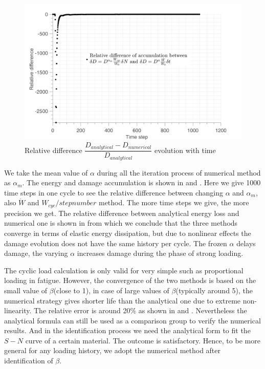 \begin{figure}[!h]
\centering
\includegraphics[width=\textwidth]{figures//D_3methods_diff_100steps.png} 
\caption{Relative difference $\dfrac{D_{analytical}-D_{numerical}}{D_{analytical}}$ evolution with time}
\label{Damagediff}
\end{figure}
We take the mean value of $\alpha$ during all the iteration process of numerical method as $\alpha_{m}$. The energy and damage accumulation is shown in  and . Here we give 1000 time steps in one cycle to see the relative difference between changing $\alpha$ and $\alpha_{m}$, also $\dot{W}$ and $W_{cyc}/stepnumber$  method. The more time steps we give, the more precision we get. The relative difference between analytical energy loss and numerical one is shown in  from which we conclude that the three methods converge in terms of elastic energy dissipation, but due to nonlinear effects the damage evolution does not have the same history per cycle. The frozen $\alpha$ delays damage, the varying $\alpha$ increases damage during the phase of strong loading.

The cyclic load calculation is only valid for very simple such as proportional loading in fatigue. However, the convergence of the two methods is based on the small value of $\beta$(close to 1), in case of large values of $\beta$(typically around 5), the numerical strategy gives shorter life than the analytical one due to extreme non-linearity. The relative error is around 20\% as shown in  and . Nevertheless the analytical formula can still be used as a comparison group to verify the numerical results. And in the identification process we need the analytical form to fit the $S-N$ curve of a certain material. The outcome is satisfactory. Hence, to be more general for any loading history, we adopt the numerical method after identification of $\beta$. 

